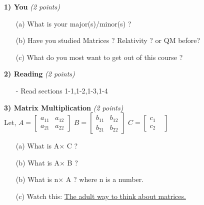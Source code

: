 {\large
\textbf{1) You} \hfill \textit{(2 points)}\\
\begin{itemize}
\item[(a)]What is your major(s)/minor(s) ? 
\item[(b)]Have you studied Matrices ? Relativity ? or QM before?
\item[(c)]What do you most want to get out of this course ? 
\end{itemize}

\vspace*{0.25in}

\textbf{2) Reading } \hfill \textit{(2 points)}\\
\begin{itemize}
\item[-] Read sections 1-1,1-2,1-3,1-4
\end{itemize}

\vspace*{0.25in}


\textbf{3) Matrix Multiplication} \hfill \textit{(2 points)}\\

Let, $A =  \begin{bmatrix}    a_{11} & a_{12}  \\ a_{21} & a_{22} \end{bmatrix}$
     $B =  \begin{bmatrix}    b_{11} & b_{12}  \\ b_{21} & b_{22} \end{bmatrix}$
     $C =  \begin{bmatrix}    c_{1}  & \\ c_{2} & \end{bmatrix}$

\begin{itemize}
\item[(a)] What is A$\times$ C ? 
\item[(b)] What is A$\times$ B ?
\item[(b)] What is n$\times$ A ? where n is a number. 
\item[(c)] Watch this:  \href{https://www.youtube.com/watch?v=kYB8IZa5AuE&list=PLZHQObOWTQDPD3MizzM2xVFitgF8hE_ab&index=3}{The adult way to think about matrices.}
\end{itemize}

\vspace*{0.25in}


}
